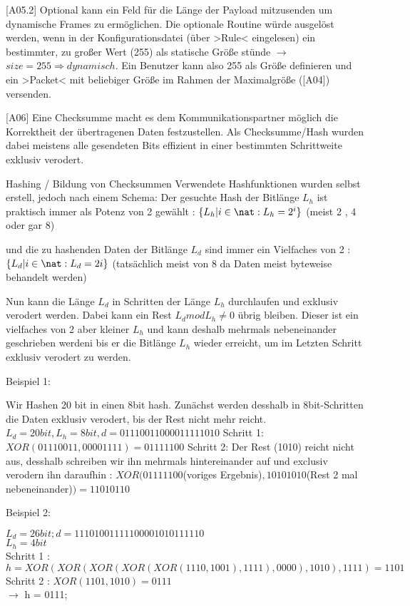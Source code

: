 	[A05.2] Optional kann ein Feld für die Länge der Payload mitzusenden um dynamische Frames zu ermöglichen. Die optionale Routine würde ausgelöst werden, wenn in der Konfigurationsdatei (über >Rule< eingelesen) ein bestimmter, zu großer Wert (255) als statische Größe stünde $\rightarrow$ $ size = 255 \Rightarrow dynamisch $. Ein Benutzer kann also 255 als Größe definieren und ein >Packet< mit beliebiger Größe im Rahmen der Maximalgröße ([A04]) versenden.


	[A06] Eine Checksumme macht es dem Kommunikationspartner möglich die Korrektheit der übertragenen Daten festzustellen. Als Checksumme/Hash wurden dabei meistens alle gesendeten Bits effizient in einer bestimmten Schrittweite exklusiv verodert.

\Large Hashing / Bildung von Checksummen
	Verwendete Hashfunktionen wurden selbst erstell, jedoch nach einem Schema:
		Der gesuchte Hash der Bitlänge $L_{h}$ ist praktisch immer als Potenz von 2 gewählt : $\{ L_{h} | i\in\nat : L_{h} = 2^{i} \}$ (meist 2 , 4 oder gar 8) \par
		und die zu hashenden Daten der Bitlänge $L_{d}$ sind immer ein Vielfaches von 2 : $\{ L_{d} | i\in\nat : L_{d} = 2i \}$ (tatsächlich meist von 8 da Daten meist byteweise behandelt werden) \par
		Nun kann die Länge $L_{d}$ in Schritten der Länge $L_{h}$ durchlaufen und exklusiv verodert werden.
		Dabei kann ein Rest $L_{d} mod L_{h} \neq 0$ übrig bleiben. Dieser ist ein vielfaches von 2 aber kleiner $L_{h}$ und kann deshalb mehrmals nebeneinander geschrieben werdeni bis er die Bitlänge $L_{h}$ wieder erreicht, um im Letzten Schritt exklusiv verodert zu werden.


		Beispiel 1:
		\begin{center}
		Wir Hashen 20 bit in einen 8bit hash. Zunächst werden desshalb in 8bit-Schritten die Daten exklusiv verodert, bis der Rest nicht mehr reicht.
		$ L_{d} = 20 bit , L_{h} = 8 bit , d = 0111 0011 0000 1111 1010 $
		Schritt 1: $ XOR(0111 0011, 0000 1111) = 0111 1100 $
		Schritt 2: Der Rest (1010) reicht nicht aus, desshalb schreiben wir ihn mehrmals hintereinander auf und exclusiv verodern ihn daraufhin :
		$ XOR(0111 1100 $(voriges Ergebnis)$ ,1010 1010 $(Rest 2 mal nebeneinander)$) = 1101 0110 $
		\end{center}

		Beispiel 2:
		\begin{center}
		$L_{d} = 26 bit ; d = 1110 1001 1111 0000 1010 1111 10$ \\
		$L_{h} = 4 bit$ \\
		Schritt 1 : $h = XOR(XOR(XOR(XOR(XOR(1110, 1001),1111),0000),1010),1111) = 1101$ \\
		Schritt 2 : $XOR(1101, 1010) = 0111$ \\
		$\rightarrow$ h = 0111;
		\end{center}

